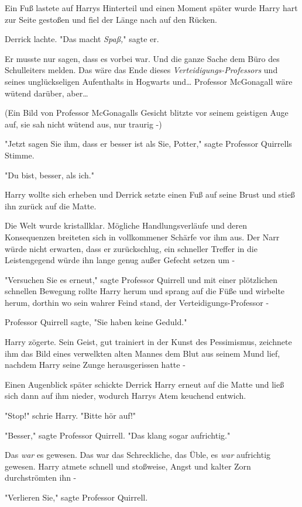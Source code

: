 {Ein Fuß lastete auf Harrys Hinterteil und einen Moment später wurde Harry hart zur Seite gestoßen und fiel der Länge nach auf den Rücken.

Derrick lachte. "Das macht \emph{Spaß,}" sagte er.

Er musste nur sagen, dass es vorbei war. Und die ganze Sache dem Büro des Schulleiters melden. Das wäre das Ende dieses \emph{Verteidigungs-Professors} und seines unglückseligen Aufenthalts in Hogwarts und… Professor McGonagall wäre wütend darüber, aber…

(Ein Bild von Professor McGonagalls Gesicht blitzte vor seinem geistigen Auge auf, sie sah nicht wütend aus, nur traurig -)

"Jetzt sagen Sie ihm, dass er besser ist als Sie, Potter," sagte Professor Quirrells Stimme.

"Du bist, besser, als ich."

Harry wollte sich erheben und Derrick setzte einen Fuß auf seine Brust und stieß ihn zurück auf die Matte.

Die Welt wurde kristallklar. Mögliche Handlungsverläufe und deren Konsequenzen breiteten sich in vollkommener Schärfe vor ihm aus. Der Narr würde nicht erwarten, dass er zurückschlug, ein schneller Treffer in die Leistengegend würde ihn lange genug außer Gefecht setzen um -

"Versuchen Sie es erneut," sagte Professor Quirrell und mit einer plötzlichen schnellen Bewegung rollte Harry herum und sprang auf die Füße und wirbelte herum, dorthin wo sein wahrer Feind stand, der Verteidigungs-Professor -

Professor Quirrell sagte, "Sie haben keine Geduld."

Harry zögerte. Sein Geist, gut trainiert in der Kunst des Pessimismus, zeichnete ihm das Bild eines verwelkten alten Mannes dem Blut aus seinem Mund lief, nachdem Harry seine Zunge herausgerissen hatte -

Einen Augenblick später schickte Derrick Harry erneut auf die Matte und ließ sich dann auf ihm nieder, wodurch Harrys Atem keuchend entwich.

"Stop!" schrie Harry. "Bitte hör auf!"

"Besser," sagte Professor Quirrell. "Das klang sogar aufrichtig."

Das \emph{war} es gewesen. Das war das Schreckliche, das Üble, es \emph{war} aufrichtig gewesen. Harry atmete schnell und stoßweise, Angst und kalter Zorn durchströmten ihn -

"Verlieren Sie," sagte Professor Quirrell.

}
